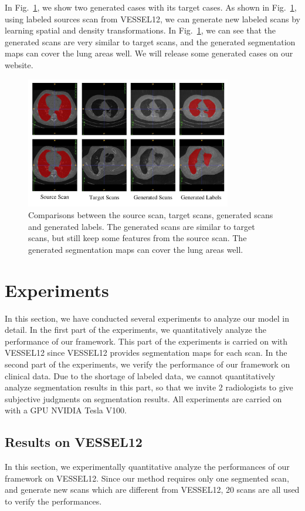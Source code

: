 \documentclass{article}
\begin{document}
In Fig.~\ref{generatedata}, we show two generated cases with its target cases.  As shown in Fig.~\ref{generatedata}, using labeled sources scan from VESSEL12, we can generate new labeled scans by learning spatial and density transformations. In Fig.~\ref{generatedata}, we can see that the generated scans are very similar to target scans, and the generated segmentation maps can cover the lung areas well. We will release some generated cases on our website.
    \begin{figure}[htbp]
    \centerline{\includegraphics[width=90mm]{generatedata.pdf}}
    \vspace{-0cm}
    \caption{Comparisons between the source scan, target scans, generated scans and generated labels. The generated scans are similar to target scans, but still keep some features from the source scan. The generated segmentation maps can cover the lung areas well.
    }
    \vspace{-0cm}
    \label{generatedata}
    \end{figure}

\section{Experiments}
\label{sec:experiments}
In this section, we have conducted several experiments to analyze our model in detail. 
In the first part of the experiments, we quantitatively analyze the performance of our framework. This part of the experiments is carried on with VESSEL12 since VESSEL12 provides segmentation maps for each scan.
In the second part of the experiments, we verify the performance of our framework on clinical data. 
Due to the shortage of labeled data, we cannot quantitatively analyze segmentation results in this part, so that we invite 2 radiologists to give subjective judgments on segmentation results.
All experiments are carried on with a GPU NVIDIA Tesla V100.

\subsection{Results on VESSEL12}
\label{subsec:vessel}
In this section, we experimentally quantitative analyze the performances of our framework on VESSEL12. Since our method requires only one segmented scan, and generate new scans which are different from VESSEL12, 20 scans are all used to verify the performances.
\end{document}
